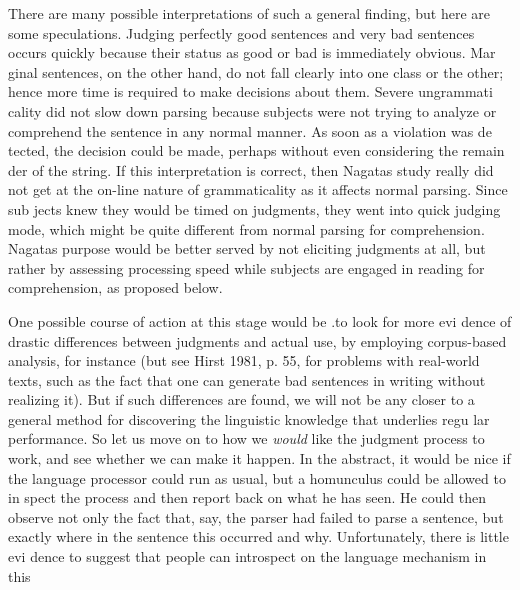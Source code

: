 \begin{styleTextbody}
There are many possible interpretations of such a general finding, but here are some speculations. Judging perfectly good sentences and very bad sentences occurs quickly because their status as good or bad is immediately obvious. Mar\- ginal sentences, on the other hand, do not fall clearly into one class or the other; hence more time is required to make decisions about them. Severe ungrammati\- cality did not slow down parsing because subjects were not trying to analyze or comprehend the sentence in any normal manner. As soon as a violation was de\- tected, the decision could be made, perhaps without even considering the remain\- der of the string. If this interpretation is correct, then Nagata{\textquotesingle}s study really did not get at the on-line nature of grammaticality as it affects normal parsing. Since sub\- jects knew they would be timed on judgments, they went into {\textquotedbl}quick judging mode,{\textquotedbl} which might be quite different from normal parsing for comprehension. Nagata{\textquotesingle}s purpose would be better served by not eliciting judgments at all, but rather by assessing processing speed while subjects are engaged in reading for comprehension, as proposed below.
\end{styleTextbody}


\begin{styleTextbody}
One possible course of action at this stage would be .to look for more evi\- dence of drastic differences between judgments and actual use, by employing corpus-based analysis, for instance (but see Hirst 1981, p. 55, for problems with real-world texts, such as the fact that one can generate bad sentences in writing without realizing it). But if such differences are found, we will not be any closer to a general method for discovering the linguistic knowledge that underlies regu\- lar performance. So let us move on to how we \textit{would}\textit{ }like the judgment process to work, and see whether we can make it happen. In the abstract, it would be nice if the language processor could run as usual, but a homunculus could be allowed to in\- spect the process and then report back on what he has seen. He could then observe not only the fact that, say, the parser had failed to parse a sentence, but exactly where in the sentence this occurred and why. Unfortunately, there is little evi\- dence to suggest that people can introspect on the language mechanism in this
\end{styleTextbody}



